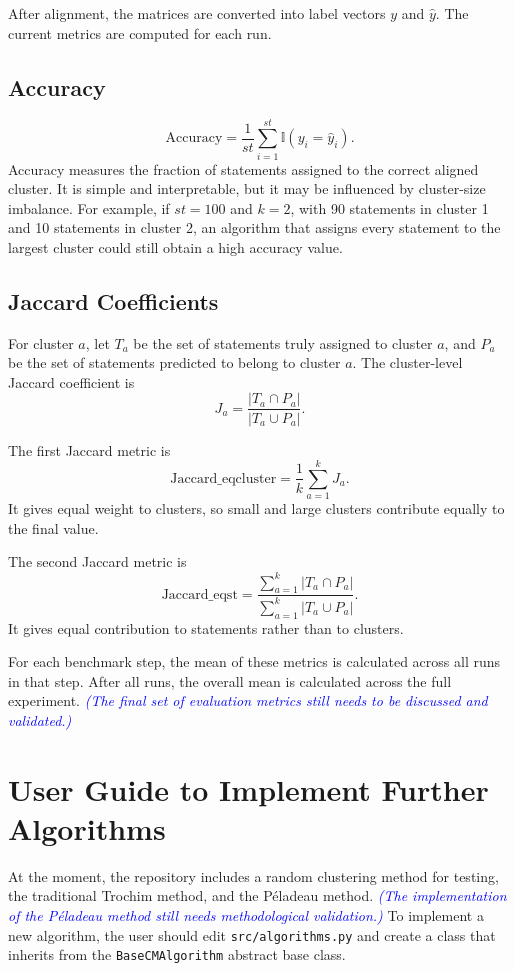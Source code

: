 \documentclass[11pt,a4paper]{article}
\newcommand{\discussionnote}[1]{\textcolor{blue}{\scriptsize\emph{(#1)}}}
\begin{document}
After alignment, the matrices are converted into label vectors \(y\) and \(\hat{y}\). The current metrics are computed for each run.

\subsection{Accuracy}

\[
\mathrm{Accuracy}
=
\frac{1}{st}
\sum_{i=1}^{st}\mathbb{I}(y_i=\hat{y}_i).
\]
Accuracy measures the fraction of statements assigned to the correct aligned cluster. It is simple and interpretable, but it may be influenced by cluster-size imbalance. For example, if \(st=100\) and \(k=2\), with 90 statements in cluster 1 and 10 statements in cluster 2, an algorithm that assigns every statement to the largest cluster could still obtain a high accuracy value.

\subsection{Jaccard Coefficients}

For cluster \(a\), let \(T_a\) be the set of statements truly assigned to cluster \(a\), and \(P_a\) be the set of statements predicted to belong to cluster \(a\). The cluster-level Jaccard coefficient is
\[
J_a
=
\frac{|T_a \cap P_a|}{|T_a \cup P_a|}.
\]

The first Jaccard metric is
\[
\mathrm{Jaccard\_eqcluster}
=
\frac{1}{k}\sum_{a=1}^{k}J_a.
\]
It gives equal weight to clusters, so small and large clusters contribute equally to the final value.

The second Jaccard metric is
\[
\mathrm{Jaccard\_eqst}
=
\frac{\sum_{a=1}^{k}|T_a \cap P_a|}
{\sum_{a=1}^{k}|T_a \cup P_a|}.
\]
It gives equal contribution to statements rather than to clusters.

For each benchmark step, the mean of these metrics is calculated across all runs in that step. After all runs, the overall mean is calculated across the full experiment. \discussionnote{The final set of evaluation metrics still needs to be discussed and validated.}

\section{User Guide to Implement Further Algorithms}

At the moment, the repository includes a random clustering method for testing, the traditional Trochim method, and the P\'eladeau method. \discussionnote{The implementation of the P\'eladeau method still needs methodological validation.} To implement a new algorithm, the user should edit \texttt{src/algorithms.py} and create a class that inherits from the \texttt{BaseCMAlgorithm} abstract base class.
\end{document}

